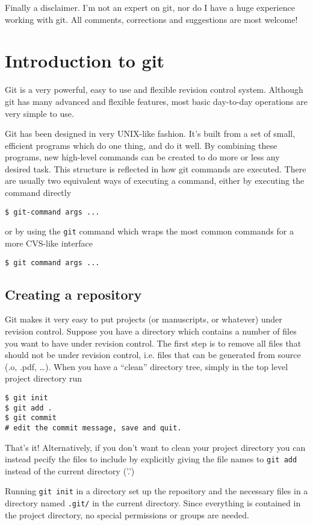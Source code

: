 \documentclass[a4paper,10pt]{article}
\begin{document}
Finally a disclaimer. I'm not an expert on git, nor do I have a huge
experience working with git. All comments, corrections and suggestions are 
most welcome!

\section{Introduction to git}
Git is a very powerful, easy to use and flexible revision control system.
Although git has many advanced and flexible features, most basic  day-to-day
operations are very simple to use. 

Git has been designed in very UNIX-like fashion. It's built from a set of
small, efficient programs which do one thing, and do it well. By combining
these programs, new high-level commands can be created to do more or less any
desired task. This structure is reflected in how git commands are executed.
There are usually two equivalent ways of executing a command, either by
executing the command directly
\begin{verbatim}
$ git-command args ...
\end{verbatim}
or by using the \texttt{git} command which wraps the most common commands for a
more CVS-like interface
\begin{verbatim}
$ git command args ...
\end{verbatim}

\subsection{Creating a repository}
Git makes it very easy to put projects (or manuscripts, or whatever) under
revision control. Suppose you have a directory which contains a number of
files you want to have under revision control. The first step is to remove all
files that should not be under revision control, i.e. files that can be
generated from source (.o, .pdf, \ldots). When you have a ``clean'' directory
tree, simply in the top level project directory run
\begin{verbatim}
$ git init
$ git add .
$ git commit
# edit the commit message, save and quit.
\end{verbatim}
That's it! Alternatively, if you don't want to clean your project directory
you can instead pecify the files to include by explicitly giving the file
names to \texttt{git add} instead of the current directory ('.')

Running \texttt{git init} in a directory set up the repository and the
necessary files in a directory named \texttt{.git/} in the current directory.
Since everything is contained in the project directory, no special permissions
or groups are needed. 
\end{document}
